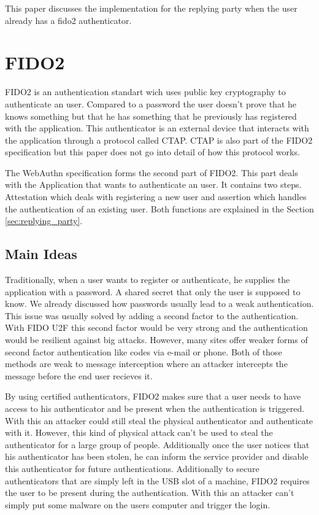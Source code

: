 \documentclass[a4paper, 11pt]{scrartcl}
\begin{document}
This paper discusses the implementation for the replying party when the user already has a fido2 authenticator.

\section{FIDO2}

FIDO2 is an authentication standart wich uses public key cryptography to authenticate an user. Compared to a password the user doesn't prove that he knows something but that he has something that he previously has registered with the application. This authenticator is an external device that interacts with the application through a protocol called CTAP. CTAP is also part of the FIDO2 specification but this paper does not go into detail of how this protocol works. \cite{ctap}

The WebAuthn specification forms the second part of FIDO2. This part deals with the Application that wants to authenticate an user. It contains two steps. Attestation which deals with registering a new user and assertion which handles the authentication of an existing user. Both functions are explained in the Section \ref{sec:replying_party}.

\subsection{Main Ideas}

Traditionally, when a user wants to register or authenticate, he supplies the application with a password. A shared secret that only the user is supposed to know. We already discussed how passwords usually lead to a weak authentication. This issue was usually solved by adding a second factor to the authentication. With FIDO U2F this second factor would be very strong and the authentication would be resilient against big attacks. However, many sites offer weaker forms of second factor authentication like codes via e-mail or phone. Both of those methods are weak to message interception where an attacker intercepts the message before the end user recieves it. \cite{smsweak}

By using certified authenticators, FIDO2 makes sure that a user needs to have access to his authenticator and be present when the authentication is triggered. With this an attacker could still steal the physical authenticator and authenticate with it. However, this kind of physical attack can't be used to steal the authenticator for a large group of people. Additionally once the user notices that his authenticator has been stolen, he can inform the service provider and disable this authenticator for future authentications. Additionally to secure authenticators that are simply left in the USB slot of a machine, FIDO2 requires the user to be present during the authentication. With this an attacker can't simply put some malware on the users computer and trigger the login. 
\end{document}

